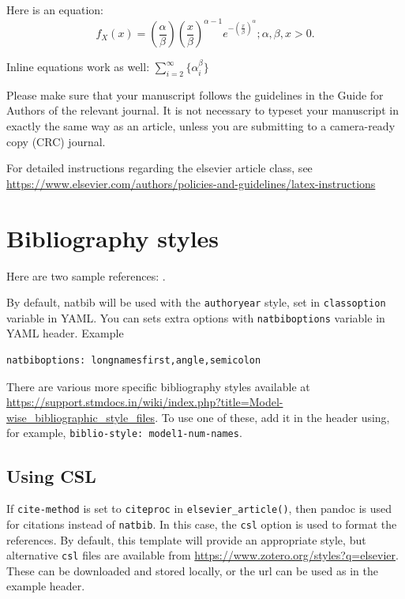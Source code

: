 \documentclass[
  super,
  preprint,
  3p]{elsarticle}
\begin{document}
Here is an equation: \[ 
  f_{X}(x) = \left(\frac{\alpha}{\beta}\right)
  \left(\frac{x}{\beta}\right)^{\alpha-1}
  e^{-\left(\frac{x}{\beta}\right)^{\alpha}}; 
  \alpha,\beta,x > 0 .
\]

Inline equations work as well: \(\sum_{i = 2}^\infty\{\alpha_i^\beta\}\)

Please make sure that your manuscript follows the guidelines in the
Guide for Authors of the relevant journal. It is not necessary to
typeset your manuscript in exactly the same way as an article, unless
you are submitting to a camera-ready copy (CRC) journal.

For detailed instructions regarding the elsevier article class, see
\url{https://www.elsevier.com/authors/policies-and-guidelines/latex-instructions}

\hypertarget{bibliography-styles}{%
\section{Bibliography styles}\label{bibliography-styles}}

Here are two sample references: \citet{Feynman1963118}
\citet{Dirac1953888}.

By default, natbib will be used with the \texttt{authoryear} style, set
in \texttt{classoption} variable in YAML. You can sets extra options
with \texttt{natbiboptions} variable in YAML header. Example

\begin{verbatim}
natbiboptions: longnamesfirst,angle,semicolon
\end{verbatim}

There are various more specific bibliography styles available at
\url{https://support.stmdocs.in/wiki/index.php?title=Model-wise_bibliographic_style_files}.
To use one of these, add it in the header using, for example,
\texttt{biblio-style:\ model1-num-names}.

\hypertarget{using-csl}{%
\subsection{Using CSL}\label{using-csl}}

If \texttt{cite-method} is set to \texttt{citeproc} in
\texttt{elsevier\_article()}, then pandoc is used for citations instead
of \texttt{natbib}. In this case, the \texttt{csl} option is used to
format the references. By default, this template will provide an
appropriate style, but alternative \texttt{csl} files are available from
\url{https://www.zotero.org/styles?q=elsevier}. These can be downloaded
and stored locally, or the url can be used as in the example header.


\renewcommand\refname{References}
  
\end{document}
